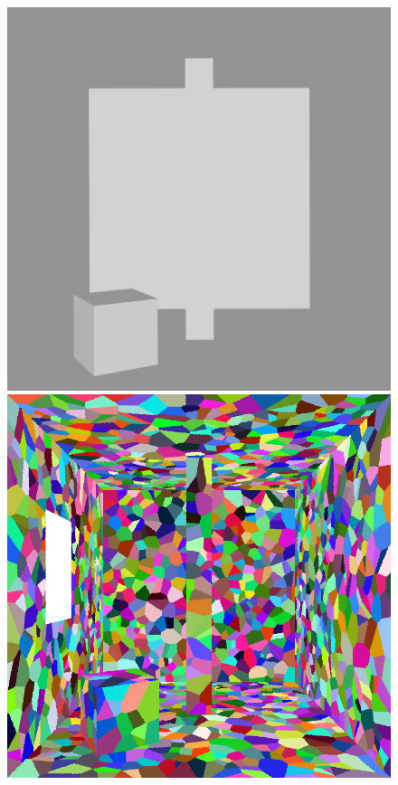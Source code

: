 \documentclass[ %
                    author={Callum Pearce},
                supervisor={Dr. Neill Campbell},
                    degree={MEng},
                     title={How effective are Temporal difference learning methods for reducing the number of zero contribution light paths, while still accurately approximating Global Illumination in Path tracing?},
                  subtitle={},
                      type={research},
                      year={2019} ]{dissertation}
\begin{document}
\begin{figure}[!htb]
\centering
{}
\includegraphics[width=1\textwidth]{images/renders/simple_room/geometry.png}
\endminipage\hfill
{}
\includegraphics[width=1\textwidth]{images/renders/simple_room/voronoi.png}

\end{figure}
\end{document}
